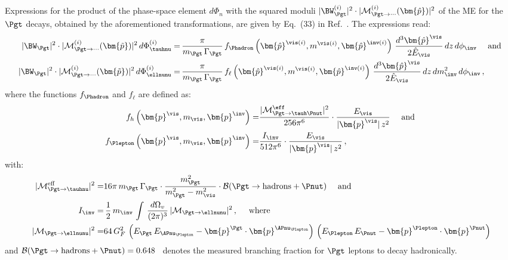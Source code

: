 Expressions for the product of the phase-space element $d\Phi_{n}$ 
with the squared moduli $\vert \BW^{(i)}_{\Pgt} \vert^{2} \cdot \vert \mathcal{M}^{(i)}_{\Pgt\to\cdots}(\bm{\hat{p}}) \vert^{2}$ 
of the ME for the $\Pgt$ decays, 
obtained by the aforementioned transformations, are given by Eq.~(33) in Ref.~\cite{SVfitMEM}.
The expressions read:
\begin{align}
\vert \BW_{\Pgt} \vert^{2} \cdot \vert \mathcal{M}^{(i)}_{\Pgt\to\cdots}(\bm{\tilde{p}}) \vert^{2} \, d\Phi^{(i)}_{\tauhnu} 
 = & \, \frac{\pi}{m_{\Pgt} \, \Gamma_{\Pgt}} \,
 f_{\Phadron}\left(\bm{\hat{p}}^{\vis(i)}, m^{\vis(i)},
   \bm{\hat{p}}^{\inv(i)}\right) \, \frac{d^{3}\bm{\hat{p}}^{\vis}}{2 \hat{E}_{\vis}} \, dz \, d\phi_{\inv} \quad \mbox{ and } \nonumber \\
\vert \BW_{\Pgt} \vert^{2} \cdot \vert \mathcal{M}^{(i)}_{\Pgt\to\cdots}(\bm{\tilde{p}}) \vert^{2} \, d\Phi^{(i)}_{\ellnunu} 
 = & \, \frac{\pi}{m_{\Pgt} \, \Gamma_{\Pgt}} \, f_{\ell}\left(\bm{\hat{p}}^{\vis(i)},
 m^{\vis(i)}, \bm{\hat{p}}^{\inv(i)}\right) \, \frac{d^{3}\bm{\hat{p}}^{\vis}}{2 \hat{E}_{\vis}} \, dz \, dm^{2}_{\inv} \, d\phi_{\inv}
 \nonumber \, ,
\end{align}
where the functions $f_{\Phadron}$ and $f_{\ell}$ are defined as:
\begin{align}
f_{h}\left(\bm{p}^{\vis}, m_{\vis}, \bm{p}^{\inv}\right) = &
  \frac{\vert\mathcal{M}^{\eff}_{\Pgt \to \tauh\Pnut}\vert^{2}}{256\pi^{6}} \cdot \frac{E_{\vis}}{\vert\bm{p}^{\vis}\vert \, z^{2}} \quad \mbox{ and } \nonumber \\
f_{\Plepton}\left(\bm{p}^{\vis}, m_{\vis}, \bm{p}^{\inv}\right) = &
  \frac{I_{\inv}}{512\pi^{6}} \cdot \frac{E_{\vis}}{\vert\bm{p}^{\vis}\vert \, z^{2}} \nonumber \, , 
\end{align}
with:
\begin{align}
\vert \mathcal{M}^{\textrm{eff}}_{\Pgt \to \tauhnu} \vert^{2} = & 16 \pi \, m_{\Pgt} \, \Gamma_{\Pgt} \cdot
  \frac{m_{\Pgt}^{2}}{m_{\Pgt}^{2} - m_{\vis}^{2}} \cdot \mathcal{B}(\Pgt \to \textrm{hadrons} + \Pnut) \quad \mbox { and } \nonumber \\
I_{\inv} = & \, \frac{1}{2} \, m_{\inv} \, \int \, \frac{d\Omega_{v}}{(2\pi)^{3}} \, 
  \vert\mathcal{M}_{\Pgt \to \ellnunu}\vert^{2} \, , \quad \mbox { where } \nonumber \\ 
\vert\mathcal{M}_{\Pgt \to \ellnunu} \vert^{2} = & 64 \, G^{2}_{F} \,
  \left( E_{\Pgt} \, E_{\APnu_{\Plepton}} - \bm{p}^{\Pgt} \cdot
  \bm{p}^{\APnu_{\Plepton}} \right) \, \left( E_{\Plepton} \,
  E_{\Pnut} - \bm{p}^{\Plepton} \cdot \bm{p}^{\Pnut} \right) \nonumber 
\end{align}
and $\mathcal{B}(\Pgt \to \textrm{hadrons} + \Pnut) = 0.648$~\cite{PDG} 
denotes the measured branching fraction for $\Pgt$ leptons to decay hadronically.

